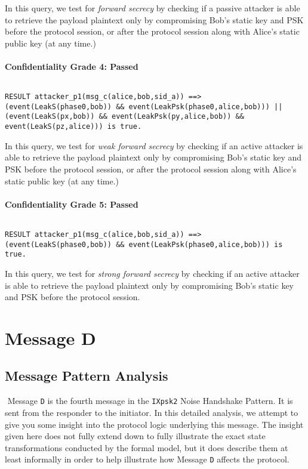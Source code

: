 In this query, we test for \emph{forward secrecy} by checking if a passive attacker is able to retrieve the payload plaintext only by compromising Bob's static key and PSK before the protocol session, or after the protocol session along with Alice's static public key (at any time.)


\paragraph{Confidentiality Grade 4: Passed}$ $
\begin{lstlisting}
RESULT attacker_p1(msg_c(alice,bob,sid_a)) ==> (event(LeakS(phase0,bob)) && event(LeakPsk(phase0,alice,bob))) || (event(LeakS(px,bob)) && event(LeakPsk(py,alice,bob)) && event(LeakS(pz,alice))) is true.
\end{lstlisting}

In this query, we test for \emph{weak forward secrecy} by checking if an active attacker is able to retrieve the payload plaintext only by compromising Bob's static key and PSK before the protocol session, or after the protocol session along with Alice's static public key (at any time.)


\paragraph{Confidentiality Grade 5: Passed}$ $
\begin{lstlisting}
RESULT attacker_p1(msg_c(alice,bob,sid_a)) ==> (event(LeakS(phase0,bob)) && event(LeakPsk(phase0,alice,bob))) is true.
\end{lstlisting}

In this query, we test for \emph{strong forward secrecy} by checking if an active attacker is able to retrieve the payload plaintext only by compromising Bob's static key and PSK before the protocol session.


\section{ Message D}

\subsection{Message Pattern Analysis}$ $
Message \texttt{D} is the fourth message in the \texttt{IXpsk2} Noise Handshake Pattern. It is sent from the responder to the initiator. In this detailed analysis, we attempt to give you some insight into the protocol logic underlying this message. The insight given here does not fully extend down to fully illustrate the exact state transformations conducted by the formal model, but it does describe them at least informally in order to help illustrate how Message \texttt{D} affects the protocol.


